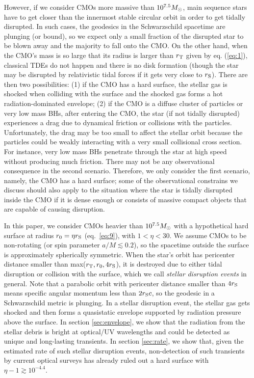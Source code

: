 \documentclass[useAMS,usenatbib]{mn2e}
\begin{document}
However, if we consider CMOs more massive than
$10^{7.5} M_{\rm \odot}$, main sequence stars have to get
closer than the innermost stable circular orbit in order to get tidally
disrupted. In such cases, the geodesics in the Schwarzschild
spacetime are plunging (or 
bound), so we expect only a small fraction of the disrupted star to be
blown away and the majority to fall onto the CMO. On the other
hand, when the CMO's mass is so large that its radius is larger than
$r_{\rm T}$ given by eq. (\ref{eq:1}), classical TDEs do not happen and
there is no disk formation (though the star may be disrupted by
relativistic tidal forces if 
it gets very close to $r_{\rm S}$). There are then two possibilities:  (1)
if the CMO has a hard surface, the stellar gas is shocked when
colliding with the surface and the shocked gas forms a hot
radiation-dominated envelope; (2) if the CMO is a diffuse cluster of
particles or very low mass BHs, after entering the CMO, the star (if
not tidally disrupted) experiences a drag due to  dynamical friction
or collisions with the 
particles. Unfortunately, the drag may be too small to 
affect the stellar orbit because the particles could be weakly
interacting with a very small collisional cross section. For instance,
very low mass BHs penetrate through the star at high speed without
producing much friction. There may not be any observational
consequence in the second scenario. Therefore, we only consider the
first scenario, namely, the CMO has a hard surface; some of the
observational constrains we discuss should also apply to the situation
where the star is tidally disrupted inside the CMO if it is dense
enough or consists of 
massive compact objects that are capable of causing disruption.

In this paper, we consider CMOs heavier than
$10^{7.5} M_{\rm \odot}$ with a hypothetical hard
surface at radius $r_0 = \eta r_{\rm S}$ (eq.~\ref{eq:9}), with $1<\eta<30$. We assume CMOs
to be non-rotating (or spin parameter $a/M\lesssim 0.2$),
so the spacetime outside the surface is approximately
spherically symmetric. When the star's
orbit has pericenter distance smaller than max($r_{\rm T},
r_0, 4r_{\rm S}$), it is destroyed due to either tidal disruption or
collision with the surface, which we call {\it stellar disruption
  events} in general. 
Note that a parabolic orbit with pericenter distance smaller
than $4r_{\rm S}$ means specific angular momentum less than $2r_{\rm
  S}c$, so the geodesic in a Schwarzschild metric is  
plunging. In a stellar disruption event, the stellar gas gets shocked
and then forms a quasistatic envelope 
supported by radiation pressure above the surface. In section
\ref{sec:envelope}, we show that the radiation from the stellar debris is
bright at optical/UV wavelengths and could be detected as unique
and long-lasting transients. In section \ref{sec:rate}, we show that,
given the estimated rate of such stellar disruption
events, non-detection of such transients by current optical surveys
has already ruled out a hard surface with $\eta-1\gtrsim10^{-4.4}$. 
\end{document}
